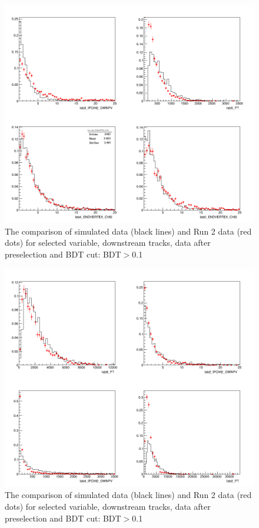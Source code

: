 \begin{figure}[ht]
\includegraphics[width=11.5cm]{figs/MC_Data_Comp/DD1_0.png}
\centering
\caption{The comparison of simulated data (black lines) and Run 2 data (red dots) for selected variable, downstream tracks, data after preselection and BDT cut: BDT$>$0.1}
\label{fig:MC_Data_Comp_DD1_0}
\end{figure}


\begin{figure}[hb]
\includegraphics[width=11.8cm]{figs/MC_Data_Comp/DD1_1.png}
\centering
\caption{The comparison of simulated data (black lines) and Run 2 data (red dots) for selected variable, downstream tracks, data after preselection and BDT cut: BDT$>$0.1}
\label{fig:MC_Data_Comp_DD1_1}
\end{figure}


